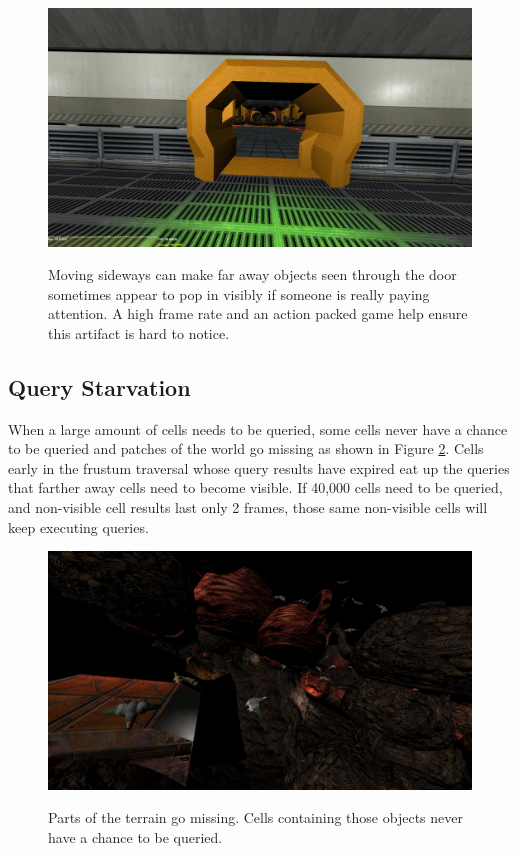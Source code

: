 \documentclass[12pt]{ucthesis}
\newcommand{\captionfonts}{\small\bf\ssp}
\begin{document}
\begin{figure}
\begin{center}
\includegraphics[width=\textwidth]{Images/HallDoorway.jpg}
\captionfonts
\caption[Hall Doorway]{Moving sideways can make far away objects seen through the door sometimes appear to pop in visibly if someone is really paying attention.
A high frame rate and an action packed game help ensure this artifact is hard to notice.}
\label{fig:hall-doorway}
\end{center}
\end{figure}

\subsection {Query Starvation}
\label{query-starvation}

When a large amount of cells needs to be queried, some cells never have a chance to be queried and patches of the world go missing as shown in Figure \ref{fig:missing-patches}.
Cells early in the frustum traversal whose query results have expired eat up the queries that farther away cells need to become visible.
If 40,000 cells need to be queried, and non-visible cell results last only 2 frames, those same non-visible cells will keep executing queries.

\begin{figure}
\begin{center}
\includegraphics[width=\textwidth]{Images/MissingPatches.jpg}
\captionfonts
\caption[Missing patches]{Parts of the terrain go missing. Cells containing those objects never have a chance to be queried.}
\label{fig:missing-patches}
\end{center}
\end{figure}
\end{document}
